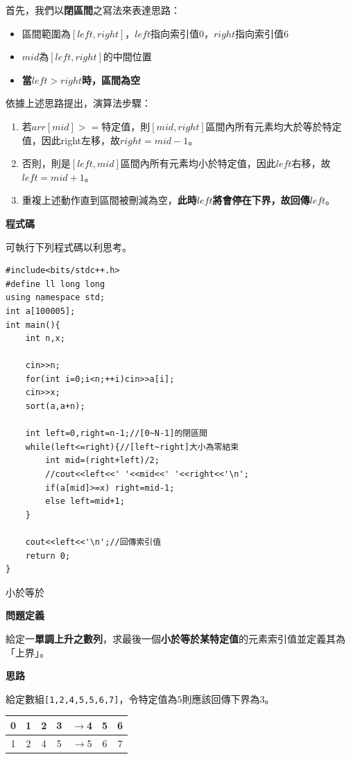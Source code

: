     首先，我們以\textbf{閉區間}之寫法來表達思路：

    \begin{itemize}
        \item 區間範圍為$[left,right]$，$left$指向索引值$0$，$right$指向索引值$6$
        \item $mid$為$[left,right]$的中間位置
        \item \textbf{當$left>right$時，區間為空}
    \end{itemize}

    依據上述思路提出，演算法步驟：

    \begin{enumerate}
        \item 若$arr[mid]>=$特定值，則$[mid,right]$區間內所有元素均大於等於特定值，因此right左移，故\textbf{$right=mid-1$}。
        \item 否則，則是$[left,mid]$區間內所有元素均小於特定值，因此$left$右移，故\textbf{$left=mid+1$}。
        \item 重複上述動作直到區間被刪減為空，\textbf{此時$left$將會停在下界，故回傳$left$}。
    \end{enumerate}

    \textbf{程式碼}

    可執行下列程式碼以利思考。

    \begin{lstlisting}
#include<bits/stdc++.h>
#define ll long long
using namespace std;
int a[100005];
int main(){
    int n,x;
    
    cin>>n;
    for(int i=0;i<n;++i)cin>>a[i];
    cin>>x;
    sort(a,a+n);
    
    int left=0,right=n-1;//[0~N-1]的閉區間 
    while(left<=right){//[left~right]大小為零結束 
        int mid=(right+left)/2;
        //cout<<left<<' '<<mid<<' '<<right<<'\n';
        if(a[mid]>=x) right=mid-1;
        else left=mid+1;
    }
    
    cout<<left<<'\n';//回傳索引值
    return 0;
}\end{lstlisting}
    
    \example 小於等於

    \textbf{問題定義}

    給定一\textbf{單調上升之數列}，求最後一個\textbf{小於等於某特定值}的元素索引值並定義其為「上界」。

    \textbf{思路}

    給定數組\verb|[1,2,4,5,5,6,7]|，令特定值為$5$則應該回傳下界為$3$。

    \begin{center}
    \begin{tabular}{|c|c|c|c|c|c|c|}
        \hline
        0 & 1 & 2 & 3 & $\to$4 & 5 & 6 \\
        \hline
        1 & 2 & 4 & 5 & $\to$5 & 6 & 7 \\
        \hline
    \end{tabular}
    \end{center}

